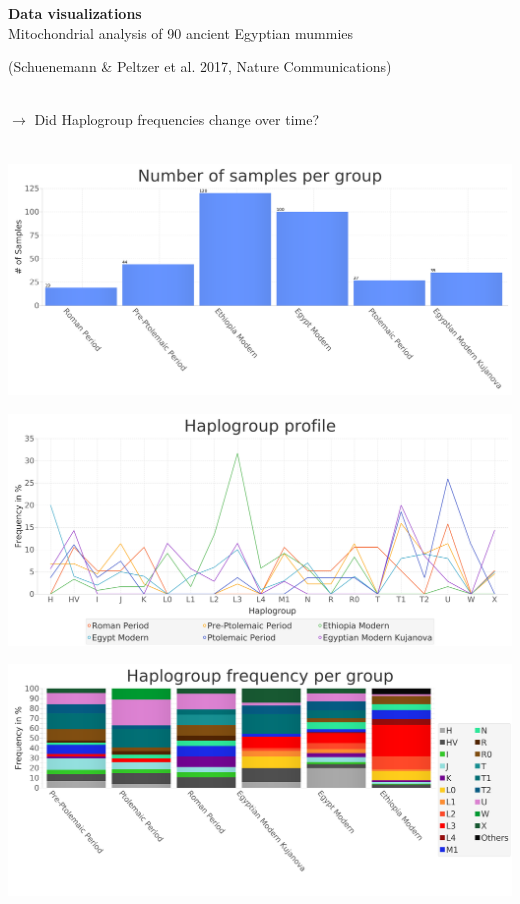 \documentclass[a0paper,portrait]{baposter}
\begin{document}
\begin{poster}
{\textbf{Data visualizations}\\
Mitochondrial analysis of 90 ancient Egyptian mummies \begin{footnotesize}(Schuenemann \& Peltzer et al. 2017, Nature Communications)\end{footnotesize}\\
$\rightarrow$ Did Haplogroup frequencies change over time?\\
\\
	\begin{minipage}{0.5\textwidth}
		\includegraphics[width=\textwidth]{figures/group_sizes2.png}
	\end{minipage}
	\begin{minipage}{0.5\textwidth}
			\includegraphics[width=\textwidth]{figures/profile.png}
	\end{minipage}

	\begin{minipage}{0.9\textwidth}
		\includegraphics[width=\textwidth]{figures/stackedBarchart2.png}
	\end{minipage}


}
\end{poster}
\end{document}
